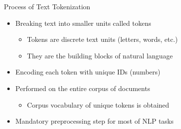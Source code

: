 \documentclass[11pt,compress,t,notes=noshow, xcolor=table]{beamer}
\begin{document}


\begin{vbframe}{Process of Text Tokenization}

\vfill

\begin{itemize}
	\item Breaking text into smaller units called tokens
		\begin{itemize}
			\item Tokens are discrete text units (letters, words, etc.)
			\item They are the building blocks of natural language
		\end{itemize}
	\item Encoding each token with unique IDs (numbers)
	\item Performed on the entire corpus of documents
		\begin{itemize}
			\item Corpus vocabulary of unique tokens is obtained
		\end{itemize}
	\item Mandatory preprocessing step for most of NLP tasks

\end{itemize}

\vfill

\end{vbframe}

\end{document}
